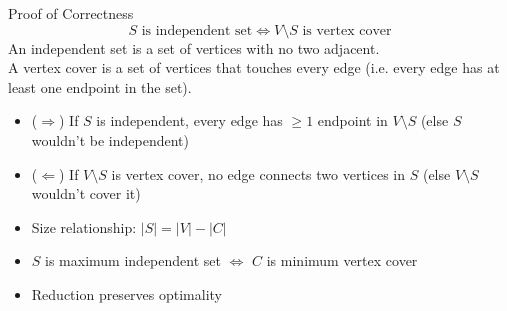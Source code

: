 \documentclass{beamer}
\begin{document}
\begin{frame}{Proof of Correctness}
    \color{red}{Key Lemma:} \\
        \color{black}{For any graph $G=(V,E)$ and subset $S \subseteq V$:}
        \[
        S \text{ is independent set} \iff V\setminus S \text{ is vertex cover}
        \]
        An independent set is a set of vertices with no two adjacent. \\
A vertex cover is a set of vertices that touches every edge (i.e. every edge has at least one endpoint in the set).

    \color{red}{Proof:}
        \begin{itemize}
            \item ($\Rightarrow$) If $S$ is independent, every edge has $\geq 1$ endpoint in $V\setminus S$ (else $S$ wouldn't be independent)
            \item ($\Leftarrow$) If $V\setminus S$ is vertex cover, no edge connects two vertices in $S$ (else $V\setminus S$ wouldn't cover it)
        \end{itemize}
    
    \color{red}{Implications:}
        \begin{itemize}
            \item Size relationship: $|S| = |V| - |C|$
            \item $S$ is maximum independent set $\iff$ $C$ is minimum vertex cover
            \item Reduction preserves optimality
        \end{itemize}
\end{frame}
\end{document}
